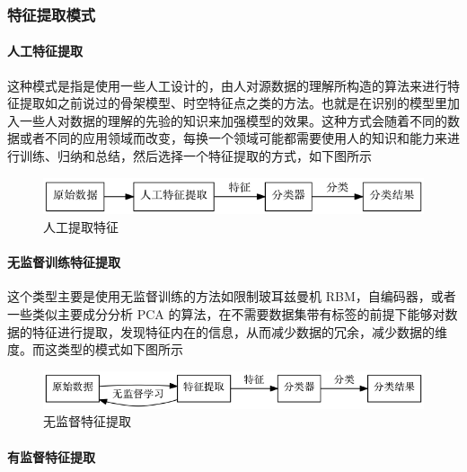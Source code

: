 \subsubsection{特征提取模式}\label{ux7279ux5f81ux63d0ux53d6ux6a21ux5f0f}

\paragraph{人工特征提取}\label{ux4ebaux5de5ux7279ux5f81ux63d0ux53d6}

这种模式是指是使用一些人工设计的，由人对源数据的理解所构造的算法来进行特征提取如之前说过的骨架模型、时空特征点之类的方法。也就是在识别的模型里加入一些人对数据的理解的先验的知识来加强模型的效果。这种方式会随着不同的数据或者不同的应用领域而改变，每换一个领域可能都需要使用人的知识和能力来进行训练、归纳和总结，然后选择一个特征提取的方式，如下图所示

\begin{figure}[htbp]
\centering
\includegraphics{picture/learning-framework1.png}
\caption{人工提取特征}
\end{figure}

\paragraph{无监督训练特征提取}\label{ux65e0ux76d1ux7763ux8badux7ec3ux7279ux5f81ux63d0ux53d6}

这个类型主要是使用无监督训练的方法如限制玻耳兹曼机
RBM，自编码器，或者一些类似主要成分分析 PCA
的算法，在不需要数据集带有标签的前提下能够对数据的特征进行提取，发现特征内在的信息，从而减少数据的冗余，减少数据的维度。而这类型的模式如下图所示

\begin{figure}[htbp]
\centering
\includegraphics{picture/learning-framework2.png}
\caption{无监督特征提取}
\end{figure}

\paragraph{有监督特征提取}\label{ux6709ux76d1ux7763ux7279ux5f81ux63d0ux53d6}

